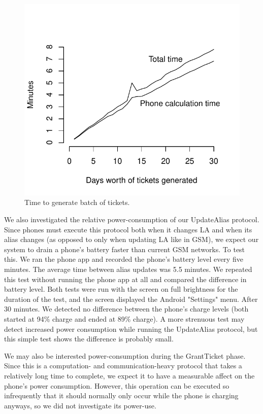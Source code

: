 \documentclass[11pt]{article}
\begin{document}
\begin{figure}[h]
\caption{Time to generate batch of tickets.}
\centering
\includegraphics{GrantTicketTime.pdf}
\end{figure}

We also investigated the relative power-consumption of our UpdateAlias protocol. Since phones must execute this protocol both when it changes LA and when its alias changes (as opposed to only when updating LA like in GSM), we expect our system to drain a phone's battery faster than current GSM networks. To test this. We ran the phone app and recorded the phone's battery level every five minutes. The average time between alias updates was 5.5 minutes. We repeated this test without running the phone app at all and compared the difference in battery level. Both tests were run with the screen on full brightness for the duration of the test, and the screen displayed the Android "Settings" menu. After 30 minutes. We detected no difference between the phone's charge levels (both started at 94\% charge and ended at 89\% charge). A more strenuous test may detect increased power consumption while running the UpdateAlias protocol, but this simple test shows the difference is probably small.

We may also be interested power-consumption during the GrantTicket phase. Since this is a computation- and communication-heavy protocol that takes a relatively long time to complete, we expect it to have a measurable affect on the phone's power consumption. However, this operation can be executed so infrequently that it should normally only occur while the phone is charging anyways, so we did not investigate its power-use.
\end{document}
